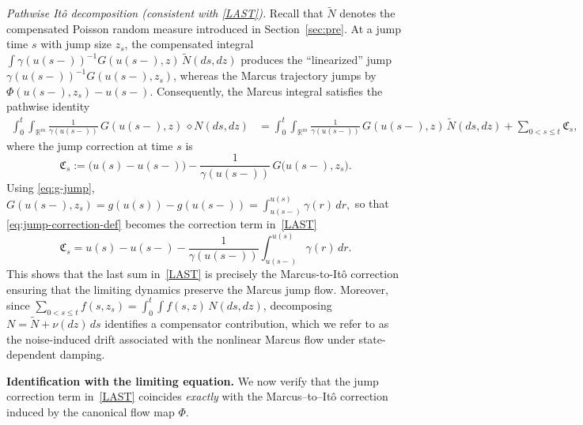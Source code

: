 \documentclass[11pt]{article}
\theoremstyle{plain}
\numberwithin{equation}{section}
\begin{document}
\smallskip
\noindent\emph{Pathwise It\^o decomposition (consistent with \eqref{LAST}).}
Recall that $\tilde N$ denotes the compensated Poisson random measure introduced in
Section~\ref{sec:pre}. At a jump time $s$ with jump size $z_s$, the compensated integral
\(\int \gamma(u(s-))^{-1}G(u(s-),z)\,\tilde N(ds,dz)\) produces the ``linearized'' jump $\gamma(u(s-))^{-1}G(u(s-),z_s)$, whereas the Marcus
trajectory jumps by $\Phi(u(s-),z_s)-u(s-)$. Consequently, the Marcus integral satisfies
the pathwise identity
\begin{align}
\int_0^t\!\!\int_{\mathbb R^m}\frac{1}{\gamma(u(s-))}\,G(u(s-),z)\,\diamond N(ds,dz)
&=\int_0^t\!\!\int_{\mathbb R^m}\frac{1}{\gamma(u(s-))}\,G(u(s-),z)\,\tilde N(ds,dz)+ \sum_{0<s\le t}\mathfrak C_s,
\label{eq:marcus-to-ito-pathwise}
\end{align}
where the jump correction at time $s$ is
\begin{equation}\label{eq:jump-correction-def}
\mathfrak C_s:= \big(u(s)-u(s-)\big)-\frac{1}{\gamma(u(s-))}\,G\big(u(s-),z_s\big).
\end{equation}
Using \eqref{eq:g-jump},
\(
G(u(s-),z_s)=g(u(s))-g(u(s-))=\int_{u(s-)}^{u(s)}\gamma(r)\,dr,
\)
so that \eqref{eq:jump-correction-def} becomes  the correction term in~\eqref{LAST}
\begin{equation}\label{eq:jump-correction-last}
\mathfrak C_s=u(s)-u(s-)-\frac{1}{\gamma(u(s-))}\int_{u(s-)}^{u(s)}\gamma(r)\,dr.
\end{equation}
This shows that the last sum in~\eqref{LAST} is precisely the Marcus-to-It\^o correction
ensuring that the limiting dynamics preserve the Marcus jump flow.
Moreover, since
$\sum_{0<s\le t}f(s,z_s)=\int_0^t\!\!\int f(s,z)\,N(ds,dz)$, decomposing
$N=\tilde N+\nu(dz)\,ds$ identifies a compensator contribution, which we refer to as the
{noise-induced drift} associated with the nonlinear Marcus flow under state-dependent damping.




\medskip
\noindent\textbf{Identification with the limiting equation.}
We now verify that the jump correction term in~\eqref{LAST} coincides \emph{exactly}
with the Marcus--to--It\^o correction induced by the canonical flow map $\Phi$.
\end{document}
